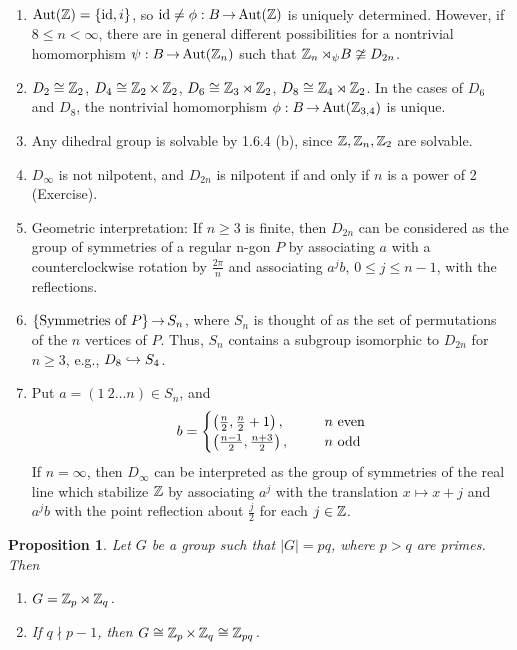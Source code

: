 \documentclass[11pt]{book}
\newcounter{counter}
\newtheorem{proposition}[counter]{Proposition}   \newtheorem{problem}[counter]{Problem}   \newtheorem*{proposition*}{Proposition}   \newtheorem*{lemma*}{Lemma}
\theoremstyle{definition}   \newtheorem{defn}[counter]{Definition} %
\DeclareMathOperator{\ra}{\rightarrow}   \DeclareMathOperator{\Poly}{\mathbf{P}}   \DeclareMathOperator{\spn}{\textnormal{span}}   \DeclareMathOperator{\aut}{\textnormal{Aut}}
\newcommand{\vs}{\vspace{8pt}}
\numberwithin{counter}{chapter}
\begin{document}
\vs

\begin{remark}
\
\begin{enumerate}
\item[(a)] $\aut(\z) = \{\id,i\}$, so $\id \ne \phi : B \ra \aut(\z)$ is uniquely determined. However, if $8 \leq n < \infty$, there are in general different possibilities for a nontrivial homomorphism $\psi : B \ra \aut(\z_n)$ such that $\operatorname{\mathbb{Z}}_n \rtimes_{\psi} B \ncong D_{2n}$.
\item[(b)] $D_2 \cong \operatorname{\mathbb{Z}}_2$, $D_4 \cong \operatorname{\mathbb{Z}}_2 \times \operatorname{\mathbb{Z}}_2$, $D_6 \cong \operatorname{\mathbb{Z}}_3 \rtimes_{}\operatorname{\mathbb{Z}}_2$, $D_8 \cong \operatorname{\mathbb{Z}}_4 \rtimes_{} \operatorname{\mathbb{Z}}_2$. In the cases of $D_6$ and $D_8$, the nontrivial homomorphism $\phi : B \ra \aut(\z_{3,4})$ is unique.
\item[(c)] Any dihedral group is solvable by 1.6.4 (b), since $\operatorname{\mathbb{Z}},\operatorname{\mathbb{Z}}_n,\operatorname{\mathbb{Z}}_2$ are solvable.
\item[(d)] $D_\infty$ is not nilpotent, and $D_{2n}$ is nilpotent if and only if $n$ is a power of 2 (Exercise).
\item[(e)] Geometric interpretation: If $n \geq 3$ is finite, then $D_{2n}$ can be considered as the group of symmetries of a regular n-gon $P$ by associating $a$ with a counterclockwise rotation by $\frac{2\pi}{n}$ and associating $a^jb$, $0 \leq j \leq n-1$, with the reflections.
\item[\tb{Consequence}] $\{\tn{Symmetries of }P\} \ra S_n$, where $S_n$ is thought of as the set of permutations of the $n$ vertices of $P$. Thus, $S_n$ contains a subgroup isomorphic to $D_{2n}$ for $n \geq 3$, e.g., $D_8 \hookrightarrow S_4$.
\item[\tb{Algebraically:}] Put $a = (1\ 2\dots n) \in S_n$, and
	\[b = \begin{cases}
	\left(\frac{n}{2},\frac{n}{2}+1\right), \qquad & n \textnormal{ even} \\
	\left( \frac{n-1}{2},\frac{n+3}{2}\right), & n \textnormal{ odd}
	\end{cases}\]
If $n = \infty$, then $D_{\infty}$ can be interpreted as the group of symmetries of the real line which stabilize $\operatorname{\mathbb{Z}}$ by associating $a^j$ with the translation $x \mapsto x+j$ and $a^jb$ with the point reflection about $\frac{j}{2}$ for each $j \in \operatorname{\mathbb{Z}}$.
\end{enumerate}
\end{remark}

\vs

\begin{proposition}
Let $G$ be a group such that $|G| = pq$, where $p>q$ are primes. Then
\begin{enumerate}
\item[(a)] $G = \operatorname{\mathbb{Z}}_p \rtimes_{} \operatorname{\mathbb{Z}}_q$.
\item[(b)] If $q \nmid p-1$, then $G \cong \operatorname{\mathbb{Z}}_p \times \operatorname{\mathbb{Z}}_q \cong \operatorname{\mathbb{Z}}_{pq}$.
\end{enumerate}
\end{proposition}
\end{document}

